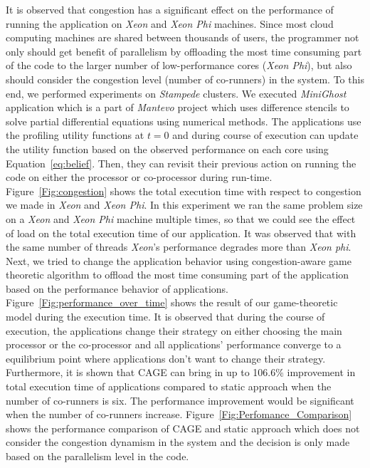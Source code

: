 \indent It is observed that congestion has a significant effect on the performance of running the application on \textit{Xeon} and \textit{Xeon Phi} machines. Since most cloud computing machines are shared between thousands of users, the programmer not only should get benefit of parallelism by offloading the most time consuming part of the code to the larger number of low-performance cores (\textit{Xeon Phi}), but also should consider the congestion level (number of co-runners) in the system. To this end, we performed experiments on \textit{Stampede} clusters. We executed \textit{MiniGhost} application which is a part of \textit{Mantevo} project \cite{mantevo} which uses difference stencils to solve partial differential equations using numerical methods. The applications use the profiling utility functions at $t=0$ and during course of execution can update the utility function based on the observed performance on each core using Equation~\ref{eq:belief}. Then, they can revisit their previous action on running the code on either the processor or co-processor during run-time. \\
\indent Figure~\ref{Fig:congestion} shows the total execution time with respect to congestion we made in \textit{Xeon} and \textit{Xeon Phi}. In this experiment we ran the same problem size on a \textit{Xeon} and \textit{Xeon Phi} machine multiple times, so that we could see the effect of load on the total execution time of our application. It was observed that with the same number of threads \textit{Xeon}'s performance degrades more than \textit{Xeon phi}. 
Next, we tried to change the application behavior using congestion-aware game theoretic algorithm to offload the most time consuming part of the application based on the performance behavior of applications. Figure~\ref{Fig:performance_over_time} shows the result of our game-theoretic model during the execution time. It is observed that during the course of execution, the applications change their strategy on either choosing the main processor or the co-processor and all applications' performance converge to a equilibrium point where applications don't want to change their strategy. \\
\indent Furthermore, it is shown that CAGE can bring in up to 106.6\% improvement in total execution time of applications compared to static approach when the number of co-runners is six. The performance improvement would be significant when the number of co-runners increase. Figure~\ref{Fig:Perfomance_Comparison} shows the performance comparison of CAGE and static approach which does not consider the congestion dynamism in the system and the decision is only made based on the parallelism level in the code. 
